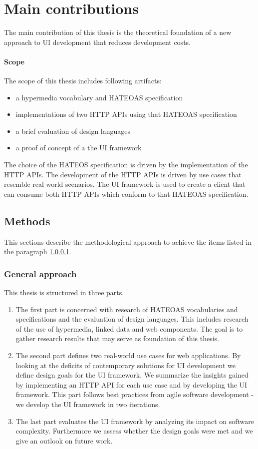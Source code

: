 \section{Main contributions}\label{contributions}
The main contribution of this thesis is the theoretical foundation of a new approach to UI development that reduces development costs.

\paragraph{Scope}\label{sec:scope}
The scope of this thesis includes following artifacts:

\begin{itemize}
\item a hypermedia vocabulary and HATEOAS specification
\item implementations of two HTTP APIs using that HATEOAS specification
\item a brief evaluation of design languages
\item a proof of concept of a the UI framework
\end{itemize}
The choice of the HATEOS specification is driven by the implementation of the HTTP APIs. The development of the HTTP APIs is driven by use cases that resemble real world scenarios. The UI framework is used to create a client that can consume both HTTP APIs which conform to that HATEOAS specification.

\subsection{Methods}
This sections describe the methodological approach to achieve the items listed in the paragraph \ref{sec:scope}.

\subsubsection{General approach}
This thesis is structured in three parts.

\begin{enumerate}
\item The first part is concerned with research of HATEOAS vocabularies and specifications and the evaluation of design languages. This includes research of the use of hypermedia, linked data and web components. The goal is to gather research results that may serve as foundation of this thesis.
\item The second part defines two real-world use cases for web applications. By looking at the deficits of contemporary solutions for UI development we define design goals for the UI framework. We summarize the insights gained by implementing an HTTP API for each use case and by developing the UI framework. This part follows best practices from agile software development - we develop the UI framework in two iterations.
\item The last part evaluates the UI framework by analyzing its impact on software complexity. Furthermore we assess whether the design goals were met and we give an outlook on future work.
\end{enumerate}

